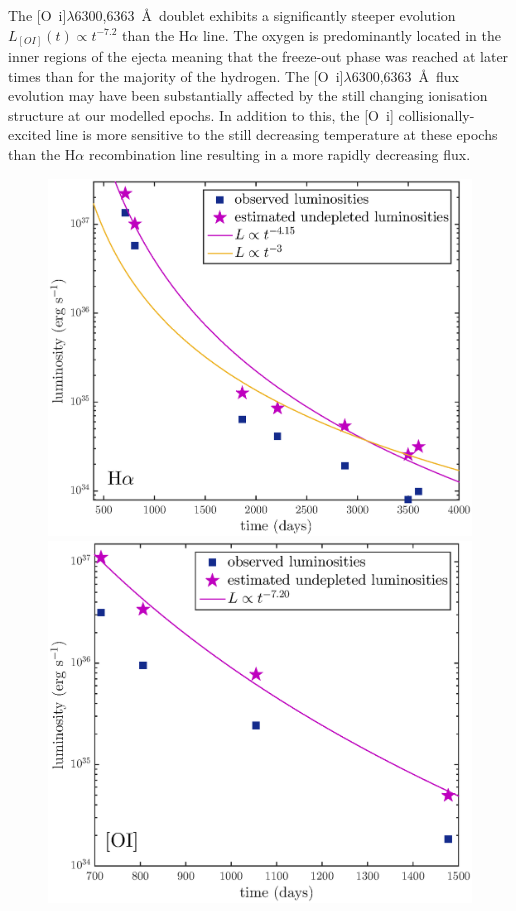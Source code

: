\documentclass[useAMS,usenatbib,usegraphicx]{mnras}
\begin{document}
The [O~{\sc i}]$\lambda$6300,6363~\AA\ doublet exhibits a significantly steeper evolution $L_{[OI]}(t) \propto t^{-7.2}$ than the H$\alpha$ line.  The oxygen is predominantly located in the inner regions of the ejecta meaning that the freeze-out phase was reached at later times than for the majority of the hydrogen.  The [O~{\sc i}]$\lambda$6300,6363~\AA\ flux evolution may have been substantially affected by the still changing ionisation structure at our modelled epochs.  In addition to this, the [O~{\sc i}] collisionally-excited line is more sensitive to the still decreasing temperature at these epochs than the H$\alpha$ recombination line resulting in a more rapidly decreasing flux.




\begin{figure}

\includegraphics[clip=true,scale=0.47]{undep_fluxes_Ha}

\vspace{2mm} \includegraphics[clip=true,scale=0.47]{undep_lum_OI}



\end{figure}
\end{document}
